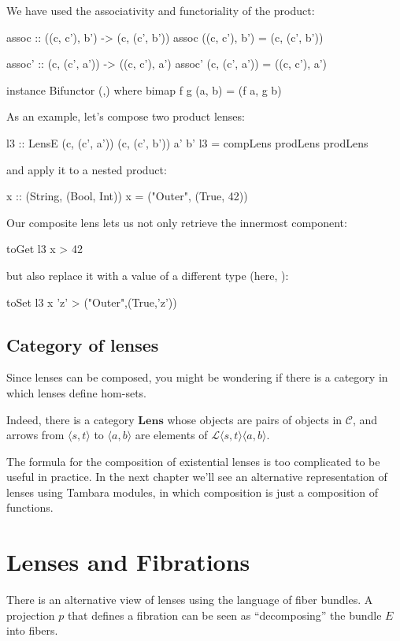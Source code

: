 \documentclass[DaoFP]{subfiles}
\begin{document}
We have used the associativity and functoriality of the product:
\begin{haskell}
assoc :: ((c, c'), b') -> (c, (c', b'))
assoc ((c, c'), b') = (c, (c', b'))

assoc' :: (c, (c', a')) -> ((c, c'), a')
assoc' (c, (c', a')) = ((c, c'), a')

instance Bifunctor (,) where
  bimap f g (a, b) = (f a, g b)
\end{haskell}

As an example, let's compose two product lenses:
\begin{haskell}
l3 :: LensE (c, (c', a')) (c, (c', b')) a' b'
l3 = compLens prodLens prodLens
\end{haskell}
and apply it to a nested product:
\begin{haskell}
x :: (String, (Bool, Int))
x = ("Outer", (True, 42))
\end{haskell}
Our composite lens lets us not only retrieve the innermost component:
\begin{haskell}
toGet l3 x
> 42
\end{haskell}
but also replace it with a value of a different type (here, ):
\begin{haskell}
toSet l3 x 'z'
> ("Outer",(True,'z'))
\end{haskell}

\subsection{Category of lenses}

Since lenses can be composed, you might be wondering if there is a category in which lenses define hom-sets. 

Indeed, there is a category $\mathbf{Lens}$ whose objects are pairs of objects in $\mathcal{C}$, and arrows from $\langle s, t\rangle$ to $ \langle a, b \rangle$ are elements of  $\mathcal{L} \langle s, t\rangle \langle a, b \rangle$.

The formula for the composition of existential lenses is too complicated to be useful in practice. In the next chapter we'll see an alternative representation of lenses using Tambara modules, in which composition is just a composition of functions.

\section{Lenses and Fibrations}

There is an alternative view of lenses using the language of fiber bundles. A projection $p$ that defines a fibration can be seen as ``decomposing'' the bundle $E$ into fibers. 
\end{document}
